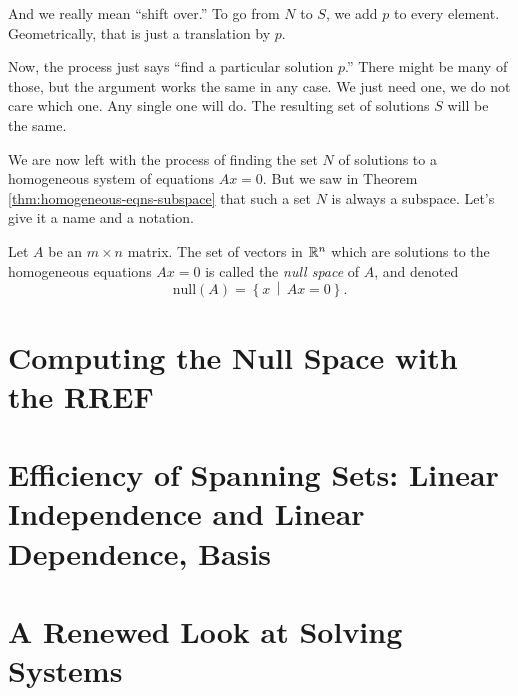 \documentclass[00-livre-main.tex]{subfiles}
\begin{document}
And we really mean ``shift over.'' To go from $N$ to $S$, we add $p$ to every element. Geometrically, that is just a translation by $p$.

Now, the process just says ``find a particular solution $p$.'' There might be many of those, but the argument works the same in any case. We just need one, we do not care which one. Any single one will do. The resulting set of solutions $S$ will be the same.

We are now left with the process of finding the set $N$ of solutions to a homogeneous system of equations $Ax=0$. But we saw in Theorem \ref{thm:homogeneous-eqns-subspace} that such a set $N$ is always a subspace. Let's give it a name and a notation.

\begin{definition}
Let $A$ be an $m\times n$ matrix. The set of vectors in $\mathbb{R}^n$ which are solutions to the homogeneous equations $Ax=0$ is called the \emph{null space} of $A$, and denoted
\[
\mathrm{null}(A) = \left\{ x \,\middle|\, Ax=0\right\}.
\]
\end{definition}


\section*{Computing the Null Space with the RREF}

\section*{Efficiency of Spanning Sets: Linear Independence and Linear Dependence, Basis}


\section*{A Renewed Look at Solving Systems}
\end{document}
